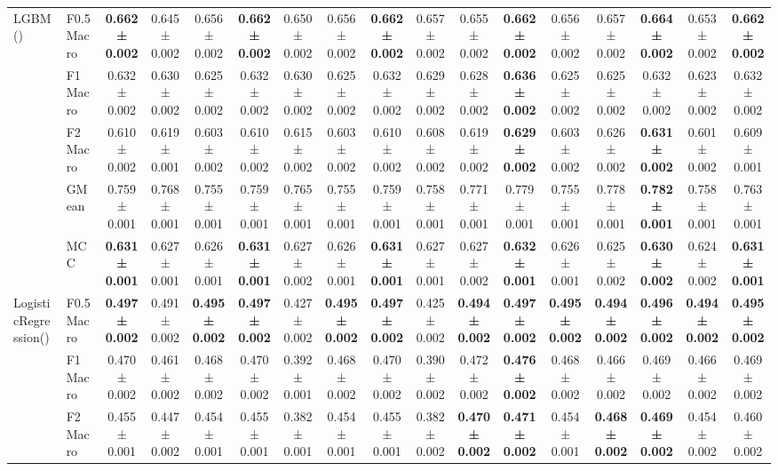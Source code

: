 \begin{table}[H]
{\begin{tabular}{llccccccccccccccc}
\cline{1-17}
\multirow[t]{5}{*}{LGBM()} & F0.5 Macro & \textbf{0.662 ± 0.002} & 0.645 ± 0.002 & 0.656 ± 0.002 & \textbf{0.662 ± 0.002} & 0.650 ± 0.002 & 0.656 ± 0.002 & \textbf{0.662 ± 0.002} & 0.657 ± 0.002 & 0.655 ± 0.002 & \textbf{0.662 ± 0.002} & 0.656 ± 0.002 & 0.657 ± 0.002 & \textbf{0.664 ± 0.002} & 0.653 ± 0.002 & \textbf{0.662 ± 0.002} \\
 & F1 Macro & 0.632 ± 0.002 & 0.630 ± 0.002 & 0.625 ± 0.002 & 0.632 ± 0.002 & 0.630 ± 0.002 & 0.625 ± 0.002 & 0.632 ± 0.002 & 0.629 ± 0.002 & 0.628 ± 0.002 & \textbf{0.636 ± 0.002} & 0.625 ± 0.002 & 0.625 ± 0.002 & 0.632 ± 0.002 & 0.623 ± 0.002 & 0.632 ± 0.002 \\
 & F2 Macro & 0.610 ± 0.002 & 0.619 ± 0.001 & 0.603 ± 0.002 & 0.610 ± 0.002 & 0.615 ± 0.002 & 0.603 ± 0.002 & 0.610 ± 0.002 & 0.608 ± 0.002 & 0.619 ± 0.002 & \textbf{0.629 ± 0.002} & 0.603 ± 0.002 & 0.626 ± 0.002 & \textbf{0.631 ± 0.002} & 0.601 ± 0.002 & 0.609 ± 0.001 \\
 & GMean & 0.759 ± 0.001 & 0.768 ± 0.001 & 0.755 ± 0.001 & 0.759 ± 0.001 & 0.765 ± 0.001 & 0.755 ± 0.001 & 0.759 ± 0.001 & 0.758 ± 0.001 & 0.771 ± 0.001 & 0.779 ± 0.001 & 0.755 ± 0.001 & 0.778 ± 0.001 & \textbf{0.782 ± 0.001} & 0.758 ± 0.001 & 0.763 ± 0.001 \\
 & MCC & \textbf{0.631 ± 0.001} & 0.627 ± 0.001 & 0.626 ± 0.001 & \textbf{0.631 ± 0.001} & 0.627 ± 0.002 & 0.626 ± 0.001 & \textbf{0.631 ± 0.001} & 0.627 ± 0.001 & 0.627 ± 0.002 & \textbf{0.632 ± 0.001} & 0.626 ± 0.001 & 0.625 ± 0.002 & \textbf{0.630 ± 0.002} & 0.624 ± 0.002 & \textbf{0.631 ± 0.001} \\
\cline{1-17}
\multirow[t]{5}{*}{LogisticRegression()} & F0.5 Macro & \textbf{0.497 ± 0.002} & 0.491 ± 0.002 & \textbf{0.495 ± 0.002} & \textbf{0.497 ± 0.002} & 0.427 ± 0.002 & \textbf{0.495 ± 0.002} & \textbf{0.497 ± 0.002} & 0.425 ± 0.002 & \textbf{0.494 ± 0.002} & \textbf{0.497 ± 0.002} & \textbf{0.495 ± 0.002} & \textbf{0.494 ± 0.002} & \textbf{0.496 ± 0.002} & \textbf{0.494 ± 0.002} & \textbf{0.495 ± 0.002} \\
 & F1 Macro & 0.470 ± 0.002 & 0.461 ± 0.002 & 0.468 ± 0.002 & 0.470 ± 0.002 & 0.392 ± 0.001 & 0.468 ± 0.002 & 0.470 ± 0.002 & 0.390 ± 0.002 & 0.472 ± 0.002 & \textbf{0.476 ± 0.002} & 0.468 ± 0.002 & 0.466 ± 0.002 & 0.469 ± 0.002 & 0.466 ± 0.002 & 0.469 ± 0.002 \\
 & F2 Macro & 0.455 ± 0.001 & 0.447 ± 0.002 & 0.454 ± 0.001 & 0.455 ± 0.001 & 0.382 ± 0.001 & 0.454 ± 0.001 & 0.455 ± 0.001 & 0.382 ± 0.002 & \textbf{0.470 ± 0.002} & \textbf{0.471 ± 0.002} & 0.454 ± 0.001 & \textbf{0.468 ± 0.002} & \textbf{0.469 ± 0.002} & 0.454 ± 0.002 & 0.460 ± 0.002 \\

\end{tabular}}
\end{table}
